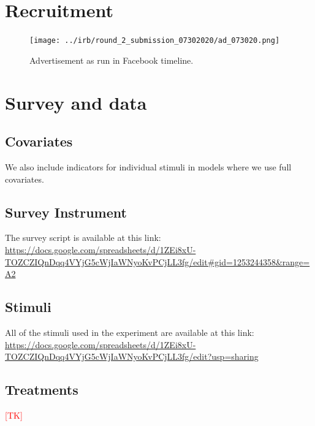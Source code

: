 \documentclass[letterpaper, 12pt, parskip=full,]{scrartcl}
\begin{document}
\clearpage



\clearpage
\appendix

\section{Recruitment}\label{appendix:recruitment}

\begin{figure}[htb]
\centering
\caption{Advertisement as run in Facebook timeline.}
\label{fig:ad}
\texttt{[image: ../irb/round\_2\_submission\_07302020/ad\_073020.png]}
\end{figure}

\section{Survey and data}\label{appendix:data}
\subsection{Covariates}\label{appendix:covariates}



We also include indicators for individual stimuli in models where we use full covariates.

\subsection{Survey Instrument}\label{appendix:survey}
The survey script is available at this link:\\
\url{https://docs.google.com/spreadsheets/d/1ZEi8xU-TOZCZIQnDqq4VYjG5cWjIaWNyoKvPCjLL3fg/edit#gid=1253244358&range=A2}


\subsection{Stimuli}\label{appendis:stimuli}

All of the stimuli used in the experiment are available at this link:\\
\url{https://docs.google.com/spreadsheets/d/1ZEi8xU-TOZCZIQnDqq4VYjG5cWjIaWNyoKvPCjLL3fg/edit?usp=sharing}


\subsection{Treatments}
\textcolor{red}{[TK]}
\end{document}
